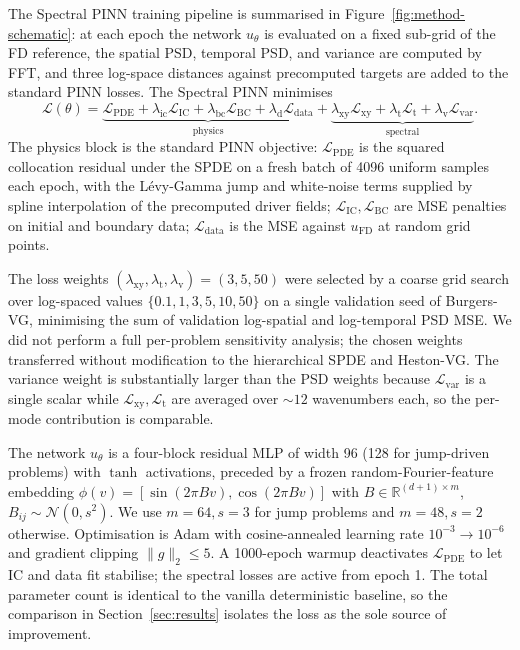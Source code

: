 \documentclass[review,12pt]{elsarticle}
\begin{document}
The Spectral PINN training pipeline is summarised in
Figure~\ref{fig:method-schematic}: at each epoch the network
\(u_\theta\) is evaluated on a fixed sub-grid of the FD reference,
the spatial PSD, temporal PSD, and variance are computed by FFT,
and three log-space distances against precomputed targets are
added to the standard PINN losses. The Spectral PINN minimises
\begin{equation}
\mathcal{L}(\theta) =
\underbrace{\mathcal L_{\mathrm{PDE}}
+ \lambda_{\mathrm{ic}} \mathcal L_{\mathrm{IC}}
+ \lambda_{\mathrm{bc}} \mathcal L_{\mathrm{BC}}
+ \lambda_{\mathrm d} \mathcal L_{\mathrm{data}}}_{\text{physics}}
+ \underbrace{\lambda_{\mathrm{xy}} \mathcal L_{\mathrm{xy}}
+ \lambda_{\mathrm t} \mathcal L_{\mathrm t}
+ \lambda_{\mathrm v} \mathcal L_{\mathrm{var}}}_{\text{spectral}}.
\label{eq:total-loss}
\end{equation}
The physics block is the standard PINN objective:
\(\mathcal L_{\mathrm{PDE}}\) is the squared collocation residual
under the SPDE on a fresh batch of 4096 uniform samples each epoch,
with the L\'evy-Gamma jump and white-noise terms supplied by spline
interpolation of the precomputed driver fields;
\(\mathcal L_{\mathrm{IC}}, \mathcal L_{\mathrm{BC}}\) are MSE
penalties on initial and boundary data; \(\mathcal L_{\mathrm{data}}\)
is the MSE against \(u_{\mathrm{FD}}\) at random grid points.

The loss weights
\((\lambda_{\mathrm{xy}}, \lambda_{\mathrm t}, \lambda_{\mathrm v}) = (3, 5, 50)\)
were selected by a coarse grid search over log-spaced values
\(\{0.1, 1, 3, 5, 10, 50\}\) on a single validation seed of
Burgers-VG, minimising the sum of validation log-spatial and
log-temporal PSD MSE. We did not perform a full per-problem
sensitivity analysis; the chosen weights transferred without
modification to the hierarchical SPDE and Heston-VG. The variance
weight is substantially larger than the PSD weights because
\(\mathcal L_{\mathrm{var}}\) is a single scalar while
\(\mathcal L_{\mathrm{xy}}, \mathcal L_{\mathrm{t}}\) are averaged
over \(\sim 12\) wavenumbers each, so the per-mode contribution is
comparable.

The network \(u_\theta\) is a four-block residual MLP of width 96
(128 for jump-driven problems) with \(\tanh\) activations, preceded
by a frozen random-Fourier-feature embedding
\(\phi(v) = [\sin(2\pi B v), \cos(2\pi B v)]\) with
\(B \in \mathbb R^{(d+1)\times m}\),
\(B_{ij} \sim \mathcal N(0, s^2)\). We use \(m=64, s=3\) for jump
problems and \(m=48, s=2\) otherwise. Optimisation is Adam with
cosine-annealed learning rate \(10^{-3} \to 10^{-6}\) and gradient
clipping \(\|g\|_2 \le 5\). A 1000-epoch warmup deactivates
\(\mathcal L_{\mathrm{PDE}}\) to let IC and data fit stabilise; the
spectral losses are active from epoch 1. The total parameter count
is identical to the vanilla deterministic baseline, so the
comparison in Section~\ref{sec:results} isolates the loss as the
sole source of improvement.
\end{document}
